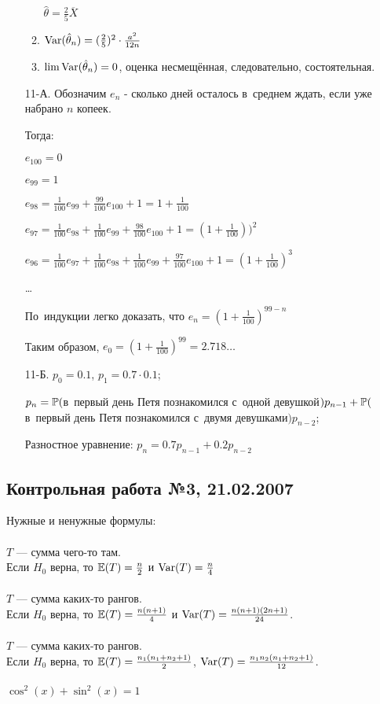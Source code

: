 \begin{enumerate}
\begin{enumerate}
$\hat{\theta}=\frac{2}{5}\overline{X}$
\item $\Var(\hat{\theta}_{n})=(\frac{2}{5})^{2}\cdot\frac{a^{2}}{12n}$
\item $\lim \Var(\hat{\theta}_{n})=0$, оценка несмещённая,
следовательно, состоятельная.
\end{enumerate}
\item[11-А.] Обозначим $e_{n}$ - сколько дней осталось в~среднем ждать, если
уже набрано $n$ копеек.

Тогда:

$e_{100}=0$

$e_{99}=1$

$e_{98}=\frac{1}{100}e_{99}+\frac{99}{100}e_{100}+1=1+\frac{1}{100}$

$e_{97}=\frac{1}{100}e_{98}+\frac{1}{100}e_{99}+\frac{98}{100}e_{100}+1=(1+\frac{1}{100}))^{2}$

$e_{96}=\frac{1}{100}e_{97}+\frac{1}{100}e_{98}+\frac{1}{100}e_{99}+\frac{97}{100}e_{100}+1=(1+\frac{1}{100})^{3}$

\ldots

По~индукции легко доказать, что $e_{n}=(1+\frac{1}{100})^{99-n}$

Таким образом, $e_{0}=(1+\frac{1}{100})^{99}=2.718 \ldots$

\item[11-Б.]  $p_{0}=0.1$, $p_{1}=0.7\cdot 0.1$;

$p_{n}=\P($в~первый день Петя познакомился с~одной
девушкой$)p_{n-1}+\P($в~первый день Петя познакомился с~двумя
девушками$)p_{n-2}$;

Разностное уравнение: $p_{n}=0.7p_{n-1}+0.2p_{n-2}$
\end{enumerate}

\subsection{Контрольная работа №3, 21.02.2007}

Нужные и ненужные формулы: \\ \\
$T$ — сумма чего-то там. \\
Если $H_{0}$ верна, то $\E(T)=\frac{n}{2}$ и $\Var(T)=\frac{n}{4}$ \\ \\
$T$ — сумма каких-то рангов. \\
Если $H_{0}$ верна, то $\E(T)=\frac{n(n+1)}{4}$ и
$\Var(T)=\frac{n(n+1)(2n+1)}{24}$. \\ \\
$T$ — сумма каких-то рангов. \\
Если $H_{0}$ верна, то $\E(T)=\frac{n_{1}(n_{1}+n_{2}+1)}{2}$,
$\Var(T)=\frac{n_{1}n_{2}(n_{1}+n_{2}+1)}{12}$. \\ \\
$\cos^{2}(x)+\sin^{2}(x)=1$ \\

